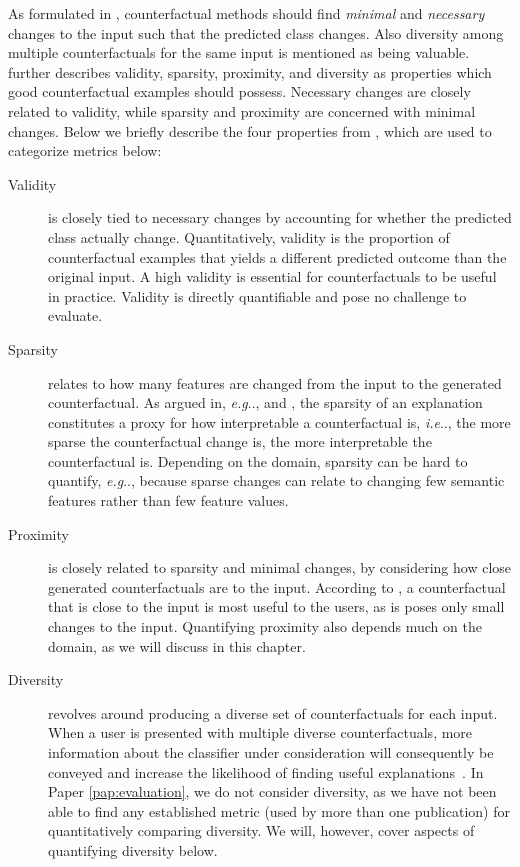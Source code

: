 \documentclass[11pt,a4paper,twoside,openright,final]{memoir}
\makeatletter
\DeclareRobustCommand\onedot{\futurelet\@let@token\@onedot}
\def\@onedot{\ifx\@let@token.\else.\null\fi\xspace}
\def\eg{\emph{e.g}\onedot} \def\Eg{\emph{E.g}\onedot}
\def\ie{\emph{i.e}\onedot} \def\Ie{\emph{I.e}\onedot}
\newcommand*{\paperref}[1]{Paper \hyperref[#1]{\ref{#1}}}
\makeatother
\begin{document}
As formulated in \citet{Wachter2017}, counterfactual methods should find \emph{minimal} and \emph{necessary} changes to the input such that the predicted class changes.
Also diversity among multiple counterfactuals for the same input is mentioned as being valuable.
\citet{Mothilal2020} further describes validity, sparsity, proximity, and diversity as properties which good counterfactual examples should possess.
Necessary changes are closely related to validity, while sparsity and proximity are concerned with minimal changes. 
Below we briefly describe the four properties from \cite{Mothilal2020}, which are used to categorize metrics below:

\begin{description} 
    \item[Validity] is closely tied to necessary changes by accounting for whether the predicted class actually change. 
    Quantitatively, validity is the proportion of counterfactual examples that yields a different predicted outcome than the original input.
    A high validity is essential for counterfactuals to be useful in practice.
    Validity is directly quantifiable and pose no challenge to evaluate.
    
    \item[Sparsity] relates to how many features are changed from the input to the generated counterfactual.
    As argued in, \eg, \cite{Wachter2017} and \cite{Grath2018}, the sparsity of an explanation constitutes a proxy for how interpretable a counterfactual is, \ie, the more sparse the counterfactual change is, the more interpretable the counterfactual is. 
    Depending on the domain, sparsity can be hard to quantify, \eg, because sparse changes can relate to changing few semantic features rather than few feature values.
    
    \item[Proximity] is closely related to sparsity and minimal changes, by considering how close generated counterfactuals are to the input.
    According to \cite{Mothilal2020}, a counterfactual that is close to the input is most useful to the users, as is poses only small changes to the input.
    Quantifying proximity also depends much on the domain, as we will discuss in this chapter. 
    
    \item[Diversity] revolves around producing a diverse set of counterfactuals for each input.
    When a user is presented with multiple diverse counterfactuals, more information about the classifier under consideration will consequently be conveyed and increase the likelihood of finding useful explanations~\cite{Rodriguez2021}.
    In \paperref{pap:evaluation}, we do not consider diversity, as we have not been able to find any established metric (used by more than one publication) for quantitatively comparing diversity.
    We will, however, cover aspects of quantifying diversity below.
\end{description}
\end{document}
